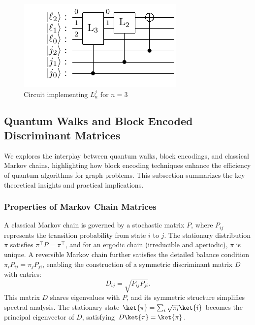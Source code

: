 \documentclass{article}
\begin{document}
\begin{figure}[htbp]
  \centering
  \includegraphics{pdf/shift_power}
  \caption{Circuit implementing $L_n^j$ for $n=3$}
  \label{fig:shift_power}
\end{figure}

\subsection{Quantum Walks and Block Encoded Discriminant Matrices}

We explores the interplay between quantum walks, block encodings, and classical Markov chains, highlighting how block encoding techniques enhance the efficiency of quantum algorithms for graph problems. This subsection summarizes the key theoretical insights and practical implications.

\subsubsection{Properties of Markov Chain Matrices}
A classical Markov chain is governed by a stochastic matrix $ P $, where $ P_{ij} $ represents the transition probability from state $ i $ to $ j $. The stationary distribution $ \pi $ satisfies $ \pi^\top P = \pi^\top $, and for an ergodic chain (irreducible and aperiodic), $ \pi $ is unique. A reversible Markov chain further satisfies the detailed balance condition $ \pi_i P_{ij} = \pi_j P_{ji} $, enabling the construction of a symmetric discriminant matrix $ D $ with entries:
\begin{equation}
D_{ij} = \sqrt{P_{ij} P_{ji}}. \label{eq:discriminant_matrix}
\end{equation}
This matrix $ D $ shares eigenvalues with $ P $, and its symmetric structure simplifies spectral analysis. The stationary state $ \ket{\pi} = \sum_i \sqrt{\pi_i} \ket{i} $ becomes the principal eigenvector of $ D $, satisfying $ D \ket{\pi} = \ket{\pi} $.
\end{document}
